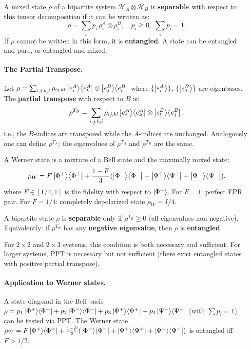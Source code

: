 \documentclass[10pt,a4paper]{article}
\begin{document}
\begin{tcolorbox}[defstyle, title={Definition}]
A mixed state $\rho$ of a bipartite system $\mathcal{H}_A\otimes\mathcal{H}_B$ is \textbf{separable} with respect to this tensor decomposition if it can be written as:
\[
\rho=\sum_i p_i\,\rho_i^A\otimes\rho_i^B, \quad p_i\ge 0,\;\sum_i p_i=1.
\]
If $\rho$ cannot be written in this form, it is \textbf{entangled}. A state can be entangled and pure, or entangled and mixed.
\end{tcolorbox}

\paragraph{The Partial Transpose.} Let $\rho=\sum_{i,j,k,l}\rho_{ij,kl}\ket{e_i^A}\!\bra{e_k^A}\otimes\ket{e_j^B}\!\bra{e_l^B}$ where $\{\ket{e_i^A}\}$, $\{\ket{e_j^B}\}$ are eigenbases. The \textbf{partial transpose} with respect to $B$ is:
\[
\rho^{T_B}=\sum_{i,j,k,l}\rho_{ij,kl}\ket{e_i^A}\!\bra{e_k^A}\otimes\ket{e_l^B}\!\bra{e_j^B},
\]
i.e., the $B$-indices are transposed while the $A$-indices are unchanged. Analogously one can define $\rho^{T_A}$; the eigenvalues of $\rho^{T_A}$ and $\rho^{T_B}$ are the same.
\begin{tcolorbox}[defstyle, title={Definition}]
A Werner state is a mixture of a Bell state and the maximally mixed state:
\[
\rho_W = F\ket{\Phi^+}\!\bra{\Phi^+} + \frac{1-F}{3}(\ket{\Phi^-}\!\bra{\Phi^-}+\ket{\Psi^+}\!\bra{\Psi^+}+\ket{\Psi^-}\!\bra{\Psi^-}),
\]
where $F\in[1/4,1]$ is the fidelity with respect to $\ket{\Phi^+}$. For $F=1$: perfect EPR pair. For $F=1/4$: completely depolarized state $\rho_W=I/4$.
\end{tcolorbox}
\begin{tcolorbox}[propstyle, title={Peres--Horodecki (PPT) Criterion}]
A bipartite state $\rho$ is \textbf{separable} only if $\rho^{T_B}\ge 0$ (all eigenvalues non-negative). Equivalently: if $\rho^{T_B}$ has any \textbf{negative eigenvalue}, then $\rho$ is \textbf{entangled}.

For $2\times 2$ and $2\times 3$ systems, this condition is both necessary and sufficient. For larger systems, PPT is necessary but not sufficient (there exist entangled states with positive partial transpose).
\end{tcolorbox}

\paragraph{Application to Werner states.} A state diagonal in the Bell basis $\rho=p_1\ket{\Phi^+}\!\bra{\Phi^+}+p_2\ket{\Phi^-}\!\bra{\Phi^-}+p_3\ket{\Psi^+}\!\bra{\Psi^+}+p_4\ket{\Psi^-}\!\bra{\Psi^-}$ (with $\sum p_i=1$) can be tested via PPT. The Werner state $\rho_W=F\ket{\Phi^+}\!\bra{\Phi^+}+\frac{1-F}{3}(\ket{\Phi^-}\!\bra{\Phi^-}+\ket{\Psi^+}\!\bra{\Psi^+}+\ket{\Psi^-}\!\bra{\Psi^-})$ is entangled iff $F>1/2$.
\end{document}
